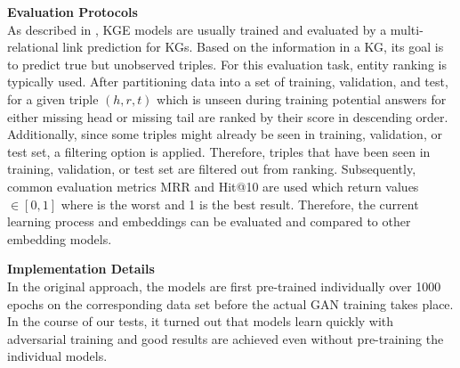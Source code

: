 \textbf{Evaluation Protocols}\\
As described in \cite{Ruffinelli2020You},
\ac{KGE} models are usually trained and evaluated by a multi-relational link prediction for \acp{KG}.
Based on the information in a \ac{KG}, its goal is to predict true but unobserved triples.
For this evaluation task, entity ranking is typically used.
After partitioning data into a set of training, validation, and test, for a given triple $(h,r,t)$ which is unseen during training potential answers for either missing head or missing tail are ranked by their score in descending order.
Additionally, since some triples might already be seen in training, validation, or test set, a filtering option is applied.
Therefore, triples that have been seen in training, validation, or test set are filtered out from ranking.
Subsequently, common evaluation metrics MRR and Hit@10 are used which return values $\in [0,1]$ where is the worst and 1 is the best result.
Therefore, the current learning process and embeddings can be evaluated and compared to other embedding models.
\clearpage

\textbf{Implementation Details}\\
In the original \kbgan approach, the models are first pre-trained individually over 1000 epochs on the corresponding data set before the actual \ac{GAN} training takes place.
In the course of our tests, it turned out that models learn quickly with adversarial training and good results are achieved even without pre-training the individual models.

